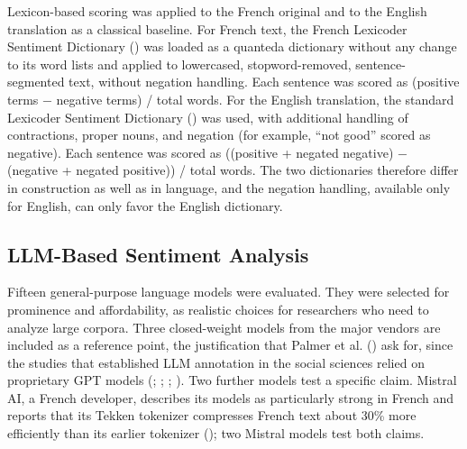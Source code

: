 \documentclass[
  man,
  floatsintext,
  longtable,
  nolmodern,
  notxfonts,
  notimes,
  colorlinks=true,linkcolor=blue,citecolor=blue,urlcolor=blue]{apa7}
\begin{document}
Lexicon-based scoring was applied to the French original and to the
English translation as a classical baseline. For French text, the French
Lexicoder Sentiment Dictionary () was loaded as a quanteda dictionary without any change to
its word lists and applied to lowercased, stopword-removed,
sentence-segmented text, without negation handling. Each sentence was
scored as (positive terms − negative terms) / total words. For the
English translation, the standard Lexicoder Sentiment Dictionary
() was used, with
additional handling of contractions, proper nouns, and negation (for
example, ``not good'' scored as negative). Each sentence was scored as
((positive + negated negative) − (negative + negated positive)) / total
words. The two dictionaries therefore differ in construction as well as
in language, and the negation handling, available only for English, can
only favor the English dictionary.

\subsection{LLM-Based Sentiment
Analysis}\label{llm-based-sentiment-analysis}

Fifteen general-purpose language models were evaluated. They were
selected for prominence and affordability, as realistic choices for
researchers who need to analyze large corpora. Three closed-weight
models from the major vendors are included as a reference point, the
justification that Palmer et al.
() ask for, since
the studies that established LLM annotation in the social sciences
relied on proprietary GPT models
(; ;
;
). Two
further models test a specific claim. Mistral AI, a French developer,
describes its models as particularly strong in French and reports that
its Tekken tokenizer compresses French text about 30\% more efficiently
than its earlier tokenizer
(); two Mistral
models test both claims.
\end{document}
